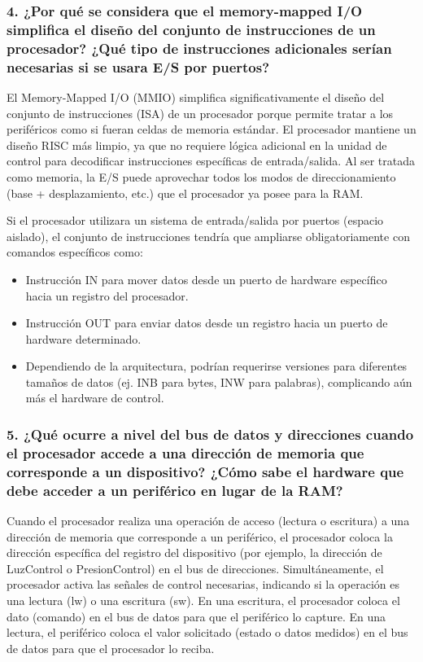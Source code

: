 \documentclass[12pt,a4paper]{article}
\begin{document}
\subsubsection{4. ¿Por qué se considera que el memory-mapped I/O simplifica el diseño del conjunto de instrucciones de un procesador? ¿Qué tipo de instrucciones adicionales serían necesarias si se usara E/S por puertos?}

El Memory-Mapped I/O (MMIO) simplifica significativamente el diseño del conjunto de instrucciones (ISA) de un procesador porque permite tratar a los periféricos como si fueran celdas de memoria estándar. El procesador mantiene un diseño RISC más limpio, ya que no requiere lógica adicional en la unidad de control para decodificar instrucciones específicas de entrada/salida. Al ser tratada como memoria, la E/S puede aprovechar todos los modos de direccionamiento (base + desplazamiento, etc.) que el procesador ya posee para la RAM.

Si el procesador utilizara un sistema de entrada/salida por puertos (espacio aislado), el conjunto de instrucciones tendría que ampliarse obligatoriamente con comandos específicos como: 
\begin{itemize}
    \item Instrucción IN para mover datos desde un puerto de hardware específico hacia un registro del procesador.
    \item Instrucción OUT para enviar datos desde un registro hacia un puerto de hardware determinado.
    \item Dependiendo de la arquitectura, podrían requerirse versiones para diferentes tamaños de datos (ej. INB para bytes, INW para palabras), complicando aún más el hardware de control.
\end{itemize}

\subsubsection{5. ¿Qué ocurre a nivel del bus de datos y direcciones cuando el procesador accede a una dirección de memoria que corresponde a un dispositivo? ¿Cómo sabe el hardware que debe acceder a un periférico en lugar de la RAM?}

Cuando el procesador realiza una operación de acceso (lectura o escritura) a una dirección de memoria que corresponde a un periférico, el procesador coloca la dirección específica del registro del dispositivo (por ejemplo, la dirección de LuzControl o PresionControl) en el bus de direcciones. Simultáneamente, el procesador activa las señales de control necesarias, indicando si la operación es una lectura (lw) o una escritura (sw). En una escritura, el procesador coloca el dato (comando) en el bus de datos para que el periférico lo capture. En una lectura, el periférico coloca el valor solicitado (estado o datos medidos) en el bus de datos para que el procesador lo reciba.
\end{document}
